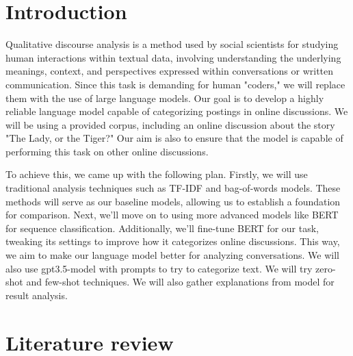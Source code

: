 \documentclass[fleqn,moreauthors,10pt]{ds_report}
\affiliation{\textit{Advisors: Slavko Žitnik}}
\begin{document}
\flushbottom 

\maketitle 

\thispagestyle{empty} 


\section*{Introduction}
    
    Qualitative discourse analysis is a method used by social scientists for studying human interactions within textual data, involving understanding the underlying meanings, context, and perspectives expressed within conversations or written communication. Since this task is demanding for human "coders," we will replace them with the use of large language models. Our goal is to develop a highly reliable language model capable of categorizing postings in online discussions. We will be using a provided corpus, including an online discussion about the story "The Lady, or the Tiger?" Our aim is also to ensure that the model is capable of performing this task on other online discussions. 


    To achieve this, we came up with the following plan. Firstly, we will use traditional analysis techniques such as TF-IDF and bag-of-words models. These methods will serve as our baseline models, allowing us to establish a foundation for comparison.  Next, we'll move on to using more advanced models like BERT for sequence classification. Additionally, we'll fine-tune BERT for our task, tweaking its settings to improve how it categorizes online discussions. This way, we aim to make our language model better for analyzing conversations. We will also use gpt3.5-model with prompts to try to categorize text. We will try zero-shot and few-shot techniques. We will also gather explanations from model for result analysis.
    
    

\section*{Literature review}
    
\end{document}
